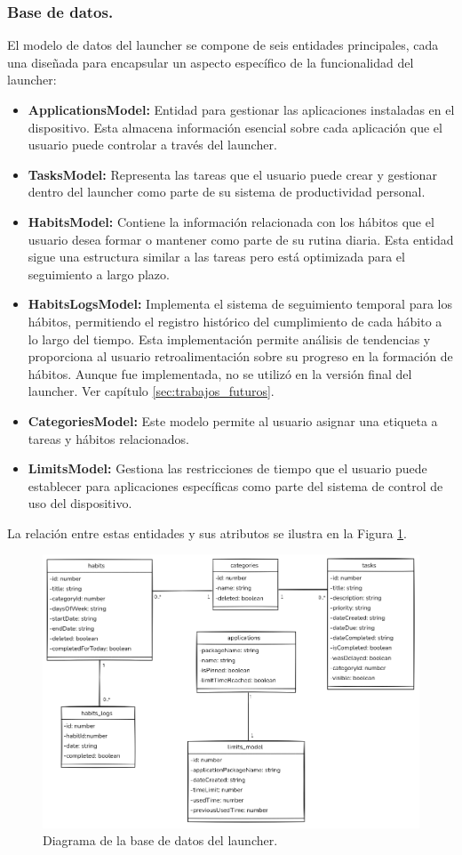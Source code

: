 \subsubsection{Base de datos.}

El modelo de datos del launcher se compone de seis entidades principales, cada una diseñada para encapsular un aspecto específico de la funcionalidad del launcher:

\begin{itemize}
  \item \textbf{ApplicationsModel:} Entidad para gestionar las aplicaciones instaladas en el dispositivo. Esta almacena información esencial sobre cada aplicación que el usuario puede controlar a través del launcher.
  \item \textbf{TasksModel:} Representa las tareas que el usuario puede crear y gestionar dentro del launcher como parte de su sistema de productividad personal.
  \item \textbf{HabitsModel:} Contiene la información relacionada con los hábitos que el usuario desea formar o mantener como parte de su rutina diaria. Esta entidad sigue una estructura similar a las tareas pero está optimizada para el seguimiento a largo plazo.
  \item \textbf{HabitsLogsModel:} Implementa el sistema de seguimiento temporal para los hábitos, permitiendo el registro histórico del cumplimiento de cada hábito a lo largo del tiempo. Esta implementación permite análisis de tendencias y proporciona al usuario retroalimentación sobre su progreso en la formación de hábitos. Aunque fue implementada, no se utilizó en la versión final del launcher. Ver capítulo \ref{sec:trabajos_futuros}.
  \item \textbf{CategoriesModel:} Este modelo permite al usuario asignar una etiqueta a tareas y hábitos relacionados.
  \item \textbf{LimitsModel:} Gestiona las restricciones de tiempo que el usuario puede establecer para aplicaciones específicas como parte del sistema de control de uso del dispositivo.
\end{itemize}


La relación entre estas entidades y sus atributos se ilustra en la Figura \ref{fig:diagrama_uml}.

\begin{figure}[ht]
  \caption{Diagrama de la base de datos del launcher.}
  \label{fig:diagrama_uml}
  \includegraphics[width=\textwidth]{Figuras/diagrama_uml.png}
  \centering
\end{figure}